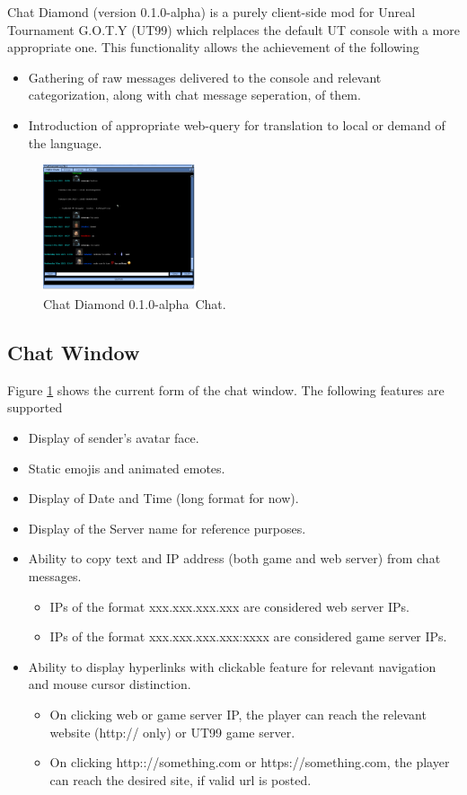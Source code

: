 \documentclass{article}
\theoremstyle{definition}
\newcommand{\ChatDiamondVersion}{0.1.0-alpha}
\begin{document}
Chat Diamond (version \ChatDiamondVersion) is a purely client-side mod for Unreal Tournament G.O.T.Y (UT99) which relplaces the default UT console with a more appropriate one.  This functionality allows the achievement of the following
\begin{itemize}
\item Gathering of raw messages delivered to the console and relevant categorization, along with chat message seperation, of them.
\item Introduction of appropriate web-query for translation to local or demand of the language.
\end{itemize}

\begin{figure}
\centering
\includegraphics[width=0.4\textwidth]{img}
\caption{Chat Diamond \ChatDiamondVersion~Chat.}
\label{fig:chatdiamond}
\end{figure}

\subsection{Chat Window}
Figure \ref{fig:chatdiamond} shows the current form of the chat window. The following features are supported
\begin{itemize}
\item Display of sender's avatar face.
\item Static emojis and animated emotes.
\item Display of Date and Time (long format for now).
\item Display of the Server name for reference purposes.
\item Ability to copy text and IP address (both game and web server) from chat messages.
\begin{itemize}
\item IPs of the format xxx.xxx.xxx.xxx are considered web server IPs.
\item IPs of the format xxx.xxx.xxx.xxx:xxxx are considered game server IPs.
\end{itemize}
\item Ability to display hyperlinks with clickable feature for relevant navigation and mouse cursor distinction.
\begin{itemize}
\item On clicking web or game server IP, the player can reach the relevant website (http:// only) or UT99 game server.
\item On clicking http:://something.com or https://something.com, the player can reach the desired site, if valid url is posted.
\end{itemize}
\end{itemize}
\end{document}
